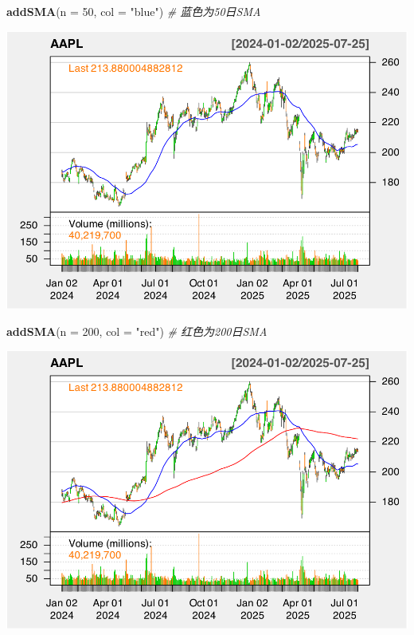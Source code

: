 \documentclass[]{ctexbook}
\newenvironment{Shaded}{\begin{snugshade}}{\end{snugshade}}
\newcommand{\AttributeTok}[1]{\textcolor[rgb]{0.13,0.29,0.53}{#1}}
\newcommand{\CommentTok}[1]{\textcolor[rgb]{0.56,0.35,0.01}{\textit{#1}}}
\newcommand{\DecValTok}[1]{\textcolor[rgb]{0.00,0.00,0.81}{#1}}
\newcommand{\FunctionTok}[1]{\textcolor[rgb]{0.13,0.29,0.53}{\textbf{#1}}}
\newcommand{\NormalTok}[1]{#1}
\newcommand{\StringTok}[1]{\textcolor[rgb]{0.31,0.60,0.02}{#1}}
\begin{document}
\begin{Shaded}
\begin{Highlighting}[]
\FunctionTok{addSMA}\NormalTok{(}\AttributeTok{n =} \DecValTok{50}\NormalTok{, }\AttributeTok{col =} \StringTok{"blue"}\NormalTok{)  }\CommentTok{\# 蓝色为50日SMA}
\end{Highlighting}
\end{Shaded}

\includegraphics[width=0.9\linewidth]{QuantmodHandbook_files/figure-latex/sma-2}

\begin{Shaded}
\begin{Highlighting}[]
\FunctionTok{addSMA}\NormalTok{(}\AttributeTok{n =} \DecValTok{200}\NormalTok{, }\AttributeTok{col =} \StringTok{"red"}\NormalTok{)  }\CommentTok{\# 红色为200日SMA}
\end{Highlighting}
\end{Shaded}

\includegraphics[width=0.9\linewidth]{QuantmodHandbook_files/figure-latex/sma-3}
\end{document}
